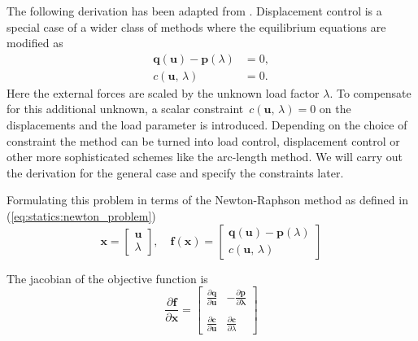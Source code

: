 The following derivation has been adapted from \cite{fem_script_uni_bochum}. Displacement control is a special case of a wider class of methods where the equilibrium equations are modified as
%
\begin{align}
\boldsymbol{q}(\boldsymbol{u}) - \boldsymbol{p}(\lambda) &= 0,\label{eq:equilibrium_dc}\\
c(\boldsymbol{u},\,\lambda) &= 0.\label{eq:constraint_dc}
\end{align}
%
Here the external forces are scaled by the unknown load factor $\lambda$. To compensate for this additional unknown, a scalar constraint~$c(\boldsymbol{u},\,\lambda) = 0$ on the displacements and the load parameter is introduced. Depending on the choice of constraint the method can be turned into load control, displacement control or other more sophisticated schemes like the arc-length method. We will carry out the derivation for the general case and specify the constraints later.

Formulating this problem in terms of the Newton-Raphson method as defined in (\ref{eq:statics:newton_problem}) 
%
\begin{equation}
\boldsymbol{x} = \begin{bmatrix} \boldsymbol{u} \\ \lambda \end{bmatrix}, \quad
\boldsymbol{f}(\boldsymbol{x}) =
\begin{bmatrix}
\boldsymbol{q}(\boldsymbol{u}) - \boldsymbol{p}(\lambda) \\
c(\boldsymbol{u},\,\lambda)
\end{bmatrix}
\label{eq:statics_newton_application_1}
\end{equation}

The jacobian of the objective function is
%
\begin{equation}
\frac{\partial \boldsymbol{f}}{\partial \boldsymbol{x}} = \begin{bmatrix}
\frac{\partial \boldsymbol{q}}{\partial \boldsymbol{u}} & -\frac{\partial \boldsymbol{p}}{\partial \boldsymbol{\lambda}} \\
\\
\frac{\partial \boldsymbol{c}}{\partial \boldsymbol{u}} & \frac{\partial \boldsymbol{c}}{\partial \lambda}
\end{bmatrix}
\label{eq:statics_newton_application_2}
\end{equation}

